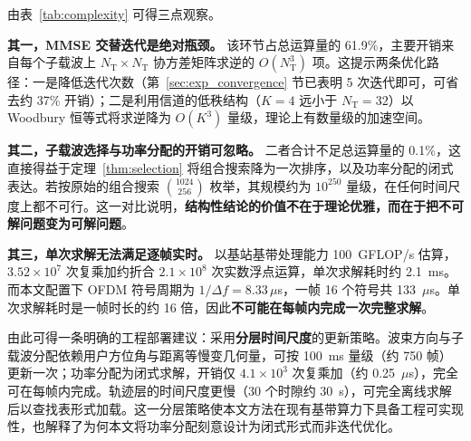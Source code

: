 \begin{table}[htbp]
  \centering
  \caption{各环节计算复杂度与代入具体配置后的运算量}
  \label{tab:complexity}
\end{table}

由表~\ref{tab:complexity} 可得三点观察。

\textbf{其一，MMSE 交替迭代是绝对瓶颈。} 该环节占总运算量的 61.9\%，主要开销来自每个子载波上 $N_{\mathrm{T}}\times N_{\mathrm{T}}$ 协方差矩阵求逆的 $O(N_{\mathrm{T}}^{3})$ 项。这提示两条优化路径：一是降低迭代次数（第~\ref{sec:exp_convergence} 节已表明 5 次迭代即可，可省去约 37\% 开销）；二是利用信道的低秩结构（$K=4$ 远小于 $N_{\mathrm{T}}=32$）以 Woodbury 恒等式将求逆降为 $O(K^{3})$ 量级，理论上有数量级的加速空间。

\textbf{其二，子载波选择与功率分配的开销可忽略。} 二者合计不足总运算量的 0.1\%，这直接得益于定理~\ref{thm:selection} 将组合搜索降为一次排序，以及功率分配的闭式表达。若按原始的组合搜索 $\binom{1024}{256}$ 枚举，其规模约为 $10^{250}$ 量级，在任何时间尺度上都不可行。这一对比说明，\textbf{结构性结论的价值不在于理论优雅，而在于把不可解问题变为可解问题}。

\textbf{其三，单次求解无法满足逐帧实时。} 以基站基带处理能力 100~GFLOP/s 估算，$3.52\times10^{7}$ 次复乘加约折合 $2.1\times10^{8}$ 次实数浮点运算，单次求解耗时约 2.1~ms。而本文配置下 OFDM 符号周期为 $1/\Delta f=8.33\,\mu$s，一帧 16 个符号共 133~$\mu$s。单次求解耗时是一帧时长的约 16 倍，因此\textbf{不可能在每帧内完成一次完整求解}。

由此可得一条明确的工程部署建议：采用\textbf{分层时间尺度}的更新策略。波束方向与子载波分配依赖用户方位角与距离等慢变几何量，可按 100~ms 量级（约 750 帧）更新一次；功率分配为闭式求解，开销仅 $4.1\times10^{3}$ 次复乘加（约 0.25~$\mu$s），完全可在每帧内完成。轨迹层的时间尺度更慢（30 个时隙约 30~s），可完全离线求解后以查找表形式加载。这一分层策略使本文方法在现有基带算力下具备工程可实现性，也解释了为何本文将功率分配刻意设计为闭式形式而非迭代优化。

